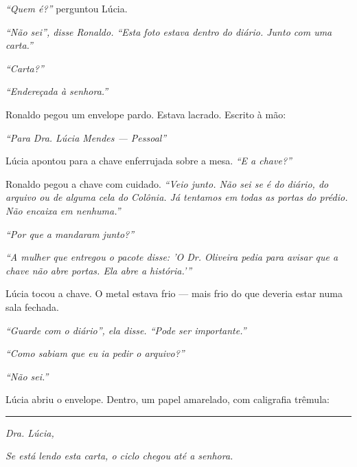 \noindent \textit{\textquotedblleft{}Quem é?\textquotedblright{}} perguntou Lúcia.

\noindent \textit{\textquotedblleft{}Não sei\textquotedblright{}\textit{, disse Ronaldo. }\textquotedblleft{}Esta foto estava dentro do diário. Junto com uma carta.\textquotedblright{}}

\noindent \textit{\textquotedblleft{}Carta?\textquotedblright{}}

\noindent \textit{\textquotedblleft{}Endereçada à senhora.\textquotedblright{}}

\noindent Ronaldo pegou um envelope pardo. Estava lacrado. Escrito à mão:

\noindent \textit{\textquotedblleft{}Para Dra. Lúcia Mendes --- Pessoal\textquotedblright{}}

\noindent Lúcia apontou para a chave enferrujada sobre a mesa. \textit{\textquotedblleft{}E a chave?\textquotedblright{}}

\noindent Ronaldo pegou a chave com cuidado. \textit{\textquotedblleft{}Veio junto. Não sei se é do diário, do arquivo ou de alguma cela do Colônia. Já tentamos em todas as portas do prédio. Não encaixa em nenhuma.\textquotedblright{}}

\noindent \textit{\textquotedblleft{}Por que a mandaram junto?\textquotedblright{}}

\noindent \textit{\textquotedblleft{}A mulher que entregou o pacote disse: 'O Dr. Oliveira pedia para avisar que a chave não abre portas. Ela abre a história.'\textquotedblright{}}

\noindent Lúcia tocou a chave. O metal estava frio --- mais frio do que deveria estar numa sala fechada.

\noindent \textit{\textquotedblleft{}Guarde com o diário\textquotedblright{}\textit{, ela disse. }\textquotedblleft{}Pode ser importante.\textquotedblright{}}

\noindent \textit{\textquotedblleft{}Como sabiam que eu ia pedir o arquivo?\textquotedblright{}}

\noindent \textit{\textquotedblleft{}Não sei.\textquotedblright{}}

\noindent Lúcia abriu o envelope. Dentro, um papel amarelado, com caligrafia trêmula:

\vspace{0.5em}\noindent\rule{\textwidth}{0.5pt}\vspace{0.5em}

\noindent \textit{Dra. Lúcia,}

\noindent \textit{Se está lendo esta carta, o ciclo chegou até a senhora.}

